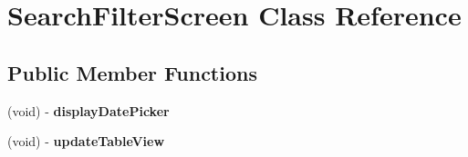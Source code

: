 \hypertarget{interface_search_filter_screen}{
\section{\-Search\-Filter\-Screen \-Class \-Reference}
\label{interface_search_filter_screen}
}
\subsection*{\-Public \-Member \-Functions}
\begin{DoxyCompactItemize}
\item 
\hypertarget{interface_search_filter_screen_a5188e9e7fc845d4b4298b2568cd456e0}{
(void) -\/ {\bfseries display\-Date\-Picker}}
\label{interface_search_filter_screen_a5188e9e7fc845d4b4298b2568cd456e0}

\item 
\hypertarget{interface_search_filter_screen_a1f3949e659aa161f94acc079669b92f1}{
(void) -\/ {\bfseries update\-Table\-View}}
\label{interface_search_filter_screen_a1f3949e659aa161f94acc079669b92f1}

\end{DoxyCompactItemize}
